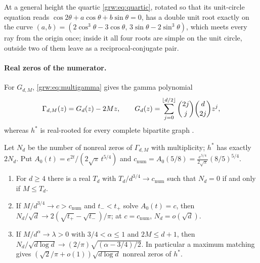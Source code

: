 At a general height the quartic \eqref{grw:eq:quartic}, rotated so that its
unit-circle equation reads $\cos2\theta+a\cos\theta+b\sin\theta=0$, has a
double unit root exactly on the curve
$(a,b)=(2\cos^3\theta-3\cos\theta,\,3\sin\theta-2\sin^3\theta)$, which meets
every ray from the origin once; inside it all four roots are simple on the
unit circle, outside two of them leave as a reciprocal-conjugate pair.

\paragraph{Real zeros of the numerator.}
For $G_{d,M}$, \eqref{grw:eq:multigamma} gives the gamma polynomial
\begin{equation}\label{grw:eq:gammamatch}
 \Gamma_{d,M}(z)=G_d(z)-2Mz,\qquad G_d(z)=\sum_{j=0}^{\lfloor d/2\rfloor}\binom{2j}j\binom d{2j}z^j,
\end{equation}
whereas $h^*$ is real-rooted for every complete bipartite graph
\cite{HigashitaniJochemkoMichalek2018Hstar}.

\begin{theorem}\label{grw:thm:numerator}
Let $N_d$ be the number of nonreal zeros of $\Gamma_{d,M}$ with
multiplicity; $h^*$ has exactly $2N_d$. Put
$A_0(t)=e^{2t}/(2\sqrt\pi\,t^{5/4})$ and
$c_{\mathrm{num}}=A_0(5/8)=\frac{e^{5/4}}{2\sqrt\pi}(8/5)^{5/4}$.
\begin{enumerate}[label=\textup{(\arabic*)}]
\item For $d\ge4$ there is a real $T_d$ with $T_d/d^{3/4}\to c_{\mathrm{num}}$
such that $N_d=0$ if and only if $M\le T_d$.
\item If $M/d^{3/4}\to c>c_{\mathrm{num}}$ and $t_-<t_+$ solve $A_0(t)=c$,
then $N_d/\sqrt d\to2(\sqrt{t_+}-\sqrt{t_-})/\pi$; at $c=c_{\mathrm{num}}$,
$N_d=o(\sqrt d)$.
\item If $M/d^\alpha\to\lambda>0$ with $3/4<\alpha\le1$ and $2M\le d+1$, then
$N_d/\sqrt{d\log d}\to(2/\pi)\sqrt{(\alpha-3/4)/2}$. In particular a maximum
matching gives $(\sqrt2/\pi+o(1))\sqrt{d\log d}$ nonreal zeros of $h^*$.
\end{enumerate}
\end{theorem}

